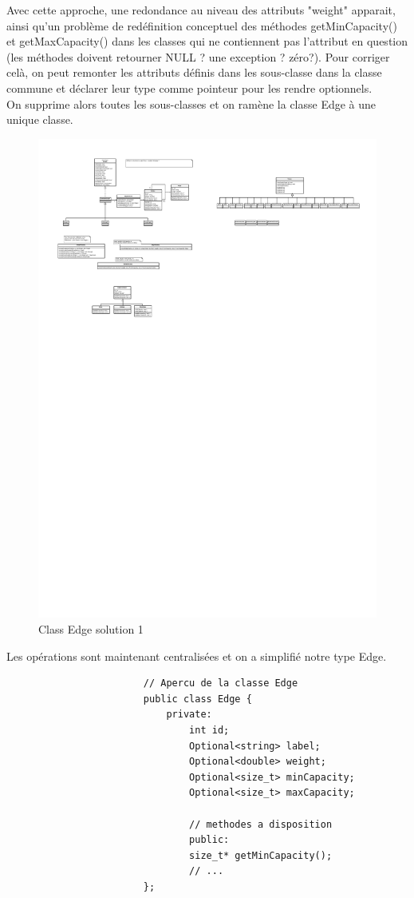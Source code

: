 \documentclass[french]{article}
\begin{document}
			Avec cette approche, une redondance au niveau des attributs "weight" apparait, ainsi qu'un problème de redéfinition conceptuel des méthodes getMinCapacity() et getMaxCapacity() dans les classes qui ne contiennent pas l'attribut en question (les méthodes doivent retourner NULL ? une exception ? zéro?).
			Pour corriger celà, on peut remonter les attributs définis dans les sous-classe dans la classe commune et déclarer leur type comme pointeur pour les rendre optionnels.\\
			On supprime alors toutes les sous-classes et on ramène la classe Edge à une unique classe.
			\begin{figure}[H]
				\centering
				\includegraphics[scale=3.0]{Conception/classedgesol2.pdf}
				\caption{Class Edge solution 1}
			\end{figure}
			Les opérations sont maintenant centralisées et on a simplifié notre type Edge.
			\begin{lstlisting}
						// Apercu de la classe Edge
						public class Edge {
							private:
								int id;
								Optional<string> label;
								Optional<double> weight;
								Optional<size_t> minCapacity;
								Optional<size_t> maxCapacity;
								
								// methodes a disposition
								public:
								size_t* getMinCapacity();
								// ...
						};
			\end{lstlisting}
		
\end{document}
